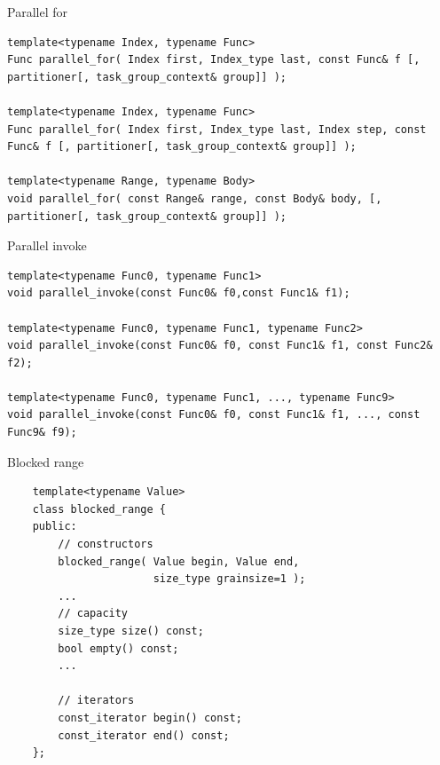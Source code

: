 \documentclass[11pt]{beamer}
\begin{document}
\begin{frame}[fragile]{Parallel for}

\begin{footnotesize}
	\lstset{style=customcpp}
	\lstset{language=C++}
	\begin{lstlisting}	
template<typename Index, typename Func>
Func parallel_for( Index first, Index_type last, const Func& f [, partitioner[, task_group_context& group]] );

template<typename Index, typename Func>
Func parallel_for( Index first, Index_type last, Index step, const Func& f [, partitioner[, task_group_context& group]] );

template<typename Range, typename Body> 
void parallel_for( const Range& range, const Body& body, [, partitioner[, task_group_context& group]] );
	\end{lstlisting}

\end{footnotesize}
\end{frame}

\begin{frame}[fragile]{Parallel invoke}
\begin{footnotesize}
	\lstset{style=customcpp}
	\lstset{language=C++}
	\begin{lstlisting}	
template<typename Func0, typename Func1>
void parallel_invoke(const Func0& f0,const Func1& f1);

template<typename Func0, typename Func1, typename Func2>
void parallel_invoke(const Func0& f0, const Func1& f1, const Func2& f2);

template<typename Func0, typename Func1, ..., typename Func9>
void parallel_invoke(const Func0& f0, const Func1& f1, ..., const Func9& f9);
	\end{lstlisting}

\end{footnotesize}
\end{frame}

\begin{frame}[fragile]{Blocked range}
	\begin{footnotesize}
	\lstset{style=customcpp}
	\lstset{language=C++}
	\begin{lstlisting}	
    template<typename Value>
    class blocked_range {
    public:
        // constructors
        blocked_range( Value begin, Value end,
                       size_type grainsize=1 );
        ...
        // capacity
        size_type size() const;
        bool empty() const;
        ...
        
        // iterators
        const_iterator begin() const;
        const_iterator end() const;
    };

	\end{lstlisting}

\end{footnotesize}
\end{frame}
\end{document}

